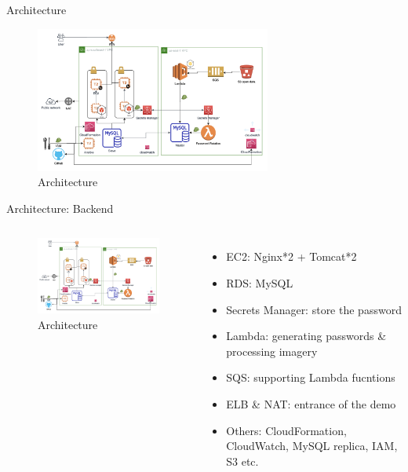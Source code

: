 \documentclass[aspectratio=169]{beamer}
\begin{document}
\begin{frame}[fragile]{Architecture}
  
  \begin{figure}[htbp]
    \centerline{\includegraphics[width=220pt]{images/arch.png}}
    \caption{Architecture}
    \label{fig2}
  \end{figure}

\end{frame}

\begin{frame}[fragile]{Architecture: Backend}

  \begin{columns}
      \begin{figure}[htbp]
        \centerline{\includegraphics[width=220pt]{images/arch.png}}
        \caption{Architecture}
        \label{arch}
      \end{figure}
      \begin{itemize}
        \item EC2: Nginx*2 + Tomcat*2
        \pause
        \item RDS: MySQL
        \pause
        \item Secrets Manager: store the password
        \pause
        \item Lambda: generating passwords \& processing imagery \cite{Howtopro5:online}
        \pause
        \item SQS: supporting Lambda fucntions
        \pause
        \item ELB \& NAT: entrance of the demo
        \pause
        \item Others: CloudFormation, CloudWatch, MySQL replica, IAM, S3 etc.
      \end{itemize}
  \end{columns}

\end{frame}
\end{document}

